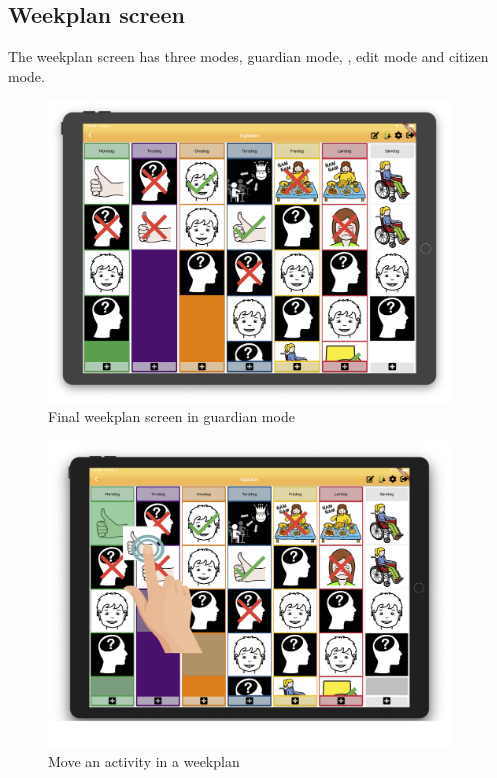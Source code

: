 \subsection{Weekplan screen}
The weekplan screen has three modes, guardian mode, , edit mode and citizen mode.
\begin{figure}[H]
    \begin{center}
        \includegraphics[width=0.95\textwidth]{figures/FinalScreen/weekplanScreen.png}
    \end{center}
    \caption{Final weekplan screen in guardian mode}
    \label{fig:finalWeekplanGuardianMode}
\end{figure}
\begin{figure}[H]
    \begin{center}
        \includegraphics[width=0.95\textwidth]{figures/FinalScreen/weekplanScreenMoveActivity.png}
    \end{center}
    \caption{Move an activity in a weekplan}
    \label{fig:finalWeekplanMoveActivity}
\end{figure}

